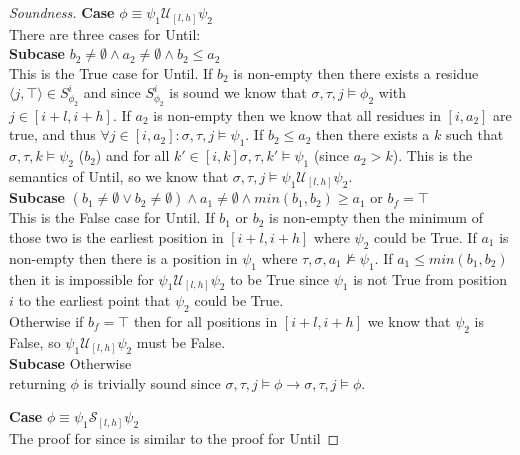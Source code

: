 \documentclass[10pt,a4paper]{article}
\newcommand{\rp}[2]{\ensuremath{\langle #1, #2 \rangle}}
\begin{document}
\begin{proof}[Soundness]
\noindent \textbf{Case} $\phi \equiv \psi_1 \mathcal{U}_{[l,h]} \psi_2$ \\
There are three cases for Until: \\
\textbf{Subcase} $b_2 \neq \emptyset \wedge a_2 \neq \emptyset \wedge b_2 \leq a_2$ \\
This is the True case for Until. If $b_2$ is non-empty then there exists a residue $\rp{j}{\top} \in S^i_{\phi_2}$ and since $S^i_{\phi_2}$ is sound we know that $\sigma, \tau, j \vDash \phi_2$ with $j \in [i+l,i+h]$. If $a_2$ is non-empty then we know that all residues in $[i,a_2]$ are true, and thus $\forall j \in [i,a_2]: \sigma, \tau, j \vDash \psi_1$. If $b_2 \leq a_2$ then there exists a $k$ such that $\sigma, \tau, k \vDash \psi_2$ ($b_2$) and for all $k' \in [i,k] \sigma, \tau, k' \vDash \psi_1$ (since $a_2 > k$). This is the semantics of Until, so we know that $\sigma, \tau, j \vDash \psi_1 \mathcal{U}_{[l,h]} \psi_2$. \\
\textbf{Subcase} $(b_1 \neq \emptyset \vee b_2 \neq \emptyset) \wedge a_1 \neq \emptyset \wedge min(b_1,b_2) \geq a_1$ or $b_f = \top$ \\
This is the False case for Until. If $b_1$ or $b_2$ is non-empty then the minimum of those two is the earliest position in $[i+l,i+h]$ where $\psi_2$ could be True. If $a_1$ is non-empty then there is a position in $\psi_1$ where $\tau, \sigma, a_1 \nvDash \psi_1$. 
If $a_1 \leq min(b_1,b_2)$ then it is impossible for $\psi_1 \mathcal{U}_{[l,h]} \psi_2$ to be True since $\psi_1$ is not True from position $i$ to the earliest point that $\psi_2$ could be True. \\
Otherwise if $b_f = \top$ then for all positions in $[i+l,i+h]$ we know that $\psi_2$ is False, so $\psi_1 \mathcal{U}_{[l,h]} \psi_2$ must be False. \\
\textbf{Subcase} Otherwise \\
returning $\phi$ is trivially sound since $\sigma, \tau, j \vDash \phi \rightarrow \sigma, \tau, j \vDash \phi$.


\noindent \textbf{Case} $\phi \equiv \psi_1 \mathcal{S}_{[l,h]} \psi_2$ \\
The proof for since is similar to the proof for Until
\end{proof}
\end{document}
